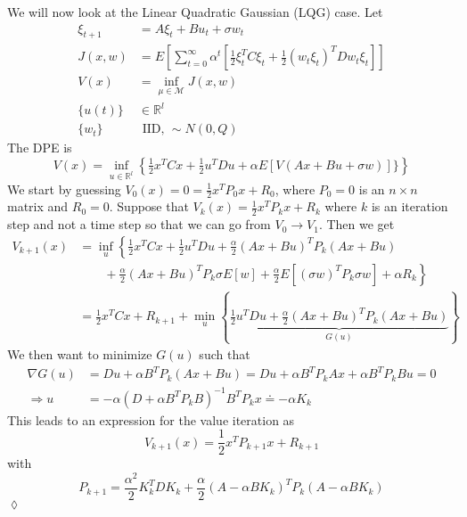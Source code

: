 \begin{example}
We will now look at the Linear Quadratic Gaussian (LQG) case. Let
\begin{align*}
\xi_{t+1} &= A\xi_t+Bu_t+\sigma w_t \\
J(x,w) &= E\left[\sum_{t=0}^\infty \alpha^t\left[\frac{1}{2}\xi_t^TC\xi_t + \frac{1}{2}(w_t\xi_t)^TDw_t\xi_t\right]\right] \\
V(x) &= \inf_{\mu\in\mathcal{M}}J(x,w) \\
\{u(t)\} &\in\mathbb{R}^l \\
\{w_t\} & \text{ IID, } \sim N(0,Q)
\end{align*}
The DPE is
$$V(x) = \inf_{u\in\mathbb{R}^l}\left\lbrace\tfrac{1}{2}x^TCx + \tfrac{1}{2}u^TDu + \alpha E[V(Ax+Bu+\sigma w)]\}\right\rbrace$$
We start by guessing $V_0(x)=0 = \frac{1}{2}x^TP_0x+R_0$, where $P_0=0$ is an $n\times n$ matrix and $R_0=0$. Suppose that $V_k(x) = \frac{1}{2}x^TP_kx+R_k$ where $k$ is an iteration step and not a time step so that we can go from $V_0\to V_1$. Then we get
\begin{align*}
V_{k+1}(x) &= \inf_u\left\lbrace\frac{1}{2}x^TCx+\frac{1}{2}u^TDu + \frac{\alpha}{2}(Ax+Bu)^TP_k(Ax+Bu) \right.\\
&\left.\qquad + \frac{\alpha}{2}(Ax+Bu)^TP_k\sigma E[w] + \frac{\alpha}{2}E[(\sigma w)^TP_k\sigma w] + \alpha R_k\right\rbrace \\
&= \frac{1}{2}x^TCx + R_{k+1} + \min_u\left\lbrace\underbrace{\frac{1}{2}u^TDu + \frac{\alpha}{2}(Ax+Bu)^TP_k(Ax+Bu)}_{G(u)}\right\rbrace
\end{align*}
We then want to minimize $G(u)$ such that
\begin{align*}
\nabla G(u) &= Du+\alpha B^TP_k(Ax+Bu) = Du + \alpha B^TP_kAx + \alpha B^TP_kBu = 0 \\
\Rightarrow u &= -\alpha(D+\alpha B^TP_kB)^{-1}B^TP_kx \doteq -\alpha K_k
\end{align*}
This leads to an expression for the value iteration as
$$V_{k+1}(x) = \frac{1}{2}x^TP_{k+1}x + R_{k+1}$$
with
$$P_{k+1} = \frac{\alpha^2}{2}K_k^TDK_k + \frac{\alpha}{2}(A-\alpha BK_k)^TP_k(A-\alpha BK_k)$$
$\lozenge$
\end{example}

